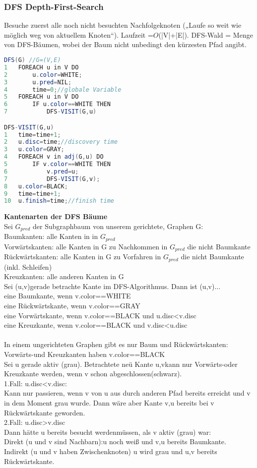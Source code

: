 \documentclass[jou,apacite]{apa6}
\begin{document}
\subsubsection{DFS Depth-First-Search}
Besuche zuerst alle noch nicht besuchten Nachfolgeknoten („Laufe so weit wie möglich weg von aktuellem Knoten“). Laufzeit =$O$(|V|+|E|). DFS-Wald = Menge von DFS-Bäumen, wobei der Baum nicht unbedingt den kürzesten Pfad angibt.
\begin{lstlisting}[language=java]
DFS(G) //G=(V,E)
1   FOREACH u in V DO
2       u.color=WHITE; 
3       u.pred=NIL;
4       time=0;//globale Variable 
5   FOREACH u in V DO
6       IF u.color==WHITE THEN
7           DFS-VISIT(G,u)

DFS-VISIT(G,u)
1   time=time+1;
2   u.disc=time;//discovery time
3   u.color=GRAY;
4   FOREACH v in adj(G,u) DO
5       IF v.color==WHITE THEN
6           v.pred=u;
7           DFS-VISIT(G,v);
8   u.color=BLACK;
9   time=time+1;
10  u.finish=time;//finish time
\end{lstlisting}
{\bfseries Kantenarten der DFS Bäume }\\
Sei $G_{pred}$ der Subgraphbaum von unserem gerichtete, Graphen G:\\
Baumkanten: alle Kanten in  in $G_{pred}$\\
Vorwärtskanten: alle Kanten in G zu Nachkommen in  $G_{pred}$ die nicht Baumkante \\
Rückwärtskanten:  alle Kanten in G zu Vorfahren in  $G_{pred}$ die nicht Baumkante (inkl. Schleifen)\\
Kreuzkanten: alle anderen Kanten in G\\
Sei (u,v)gerade betrachte Kante im DFS-Algorithmus. Dann ist (u,v)... \\
eine Baumkante, wenn v.color==WHITE\\
eine Rückwärtskante, wenn v.color==GRAY\\
eine Vorwärtskante, wenn v.color==BLACK und u.disc<v.disc\\
eine Kreuzkante, wenn v.color==BLACK und v.disc<u.disc\\
\\
In einem ungerichteten Graphen gibt es nur Baum und Rückwärtskanten:\\
Vorwärts-und Kreuzkanten haben v.color==BLACK \\
Sei u gerade aktiv (grau). Betrachtete neü Kante {u,v}kann nur Vorwärts-oder Kreuzkante werden, wenn v schon abgeschlossen(schwarz). \\
1.Fall: u.disc<v.disc: \\
Kann nur passieren, wenn v von u aus durch anderen Pfad bereits erreicht und v in dem Moment grau wurde. Dann wäre aber Kante {v,u} bereits bei v Rückwärtskante geworden. \\
2.Fall: u.disc>v.disc \\
Dann hätte u bereits besucht werdenmüssen, als v aktiv (grau) war:\\
Direkt (u und v sind Nachbarn):u noch weiß und {v,u} bereits Baumkante.\\
Indirekt (u und v haben Zwischenknoten) u wird grau und  {u,v} bereits Rückwärtskante.
\end{document}
